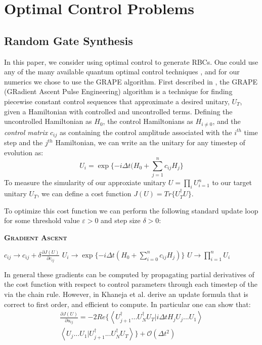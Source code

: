 \documentclass[aps,nofootinbib,pra,notitlepage,twocolumn]{revtex4-1}
\newcommand{\braket}[2]{\left\langle #1 | #2 \right\rangle}
\begin{document}
\section{Optimal Control Problems}\label{ocp}
\subsection{Random Gate Synthesis}
 In this paper, we consider using optimal control to generate RBCs. One could use any of the many available quantum optimal control techniques \cite{Khaneja2005, Caneva2011, Machnes2018}, and for our numerics we chose to use the GRAPE algorithm. First described in \cite{Khaneja2005}, the GRAPE (GRadient Ascent Pulse Engineering) algorithm is a technique for finding piecewise constant control sequences that approximate a desired unitary, $U_T$, given a Hamiltonian with controlled and uncontrolled terms. Defining the uncontrolled Hamiltonian as $H_0$, the control Hamiltonians as $H_{i\neq 0}$, and the \textit{control matrix} $c_{ij}$ as containing the control amplitude associated with the $i^{th}$ time step and the $j^{th}$ Hamiltonian, we can write an the unitary for any timestep of evolution as:
\begin{equation}\label{eq:3}
  U_i = \exp\{-i\Delta t(H_0 + \sum_{j=1}^{n}c_{ij}H_{j}\}
\end{equation}
To measure the simularity of our approxiate unitary $U=\prod_iU_{i=1}^n$ to our target unitary $U_T$, we can define a cost function $J(U) = Tr\{U_T^{\dagger}U\}$.

To optimize this cost function we can perform the following standard update loop for some threshold value $\varepsilon > 0$ and step size $\delta > 0$:
\begin{algorithm}[H]
  \caption{\textsc{\textbf{Gradient Ascent}}}
  \begin{algorithmic}
    \State $c_{ij} \rightarrow c_{ij} + \delta\frac{\partial J(U)}{\partial c_{ij}}$
    \State $U_i \rightarrow \exp\{-i\Delta t(H_0 + \sum_{i=0}^{n}c_{ij}H_j)\}$
    \EndFor
    \State $U \rightarrow \prod_{i=1}^nU_i$
    \EndWhile
  \end{algorithmic}
\end{algorithm}

In general these gradients can be computed by propagating partial derivatives of the cost function with respect to control parameters through each timestep of the  via the chain rule. However, in \cite{Khaneja2005} Khaneja et al. derive an update formula that is correct to first order, and efficient to compute. In particular one can show that:
\begin{equation}\label{eq:update}
  \begin{split}
\frac{\partial J(U)}{\partial u_{ij}} = -2Re\{\braket{{U_{j+1}^{\dagger}...U_N^{\dagger} U_T}}{i\Delta tH_jU_j...U_1}\\
\braket{U_j...U_1}{U_{j+1}^{\dagger}...U_N^{\dagger} U_T}\} +  \mathcal{O}(\Delta t^2)
  \end{split}
\end{equation}
\end{document}
